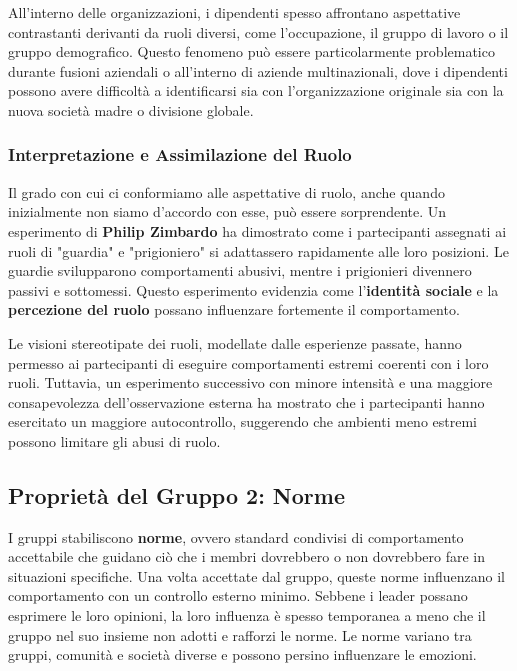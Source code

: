 \documentclass{article}
\begin{document}
All'interno delle organizzazioni, i dipendenti spesso affrontano aspettative contrastanti derivanti da ruoli diversi, come l'occupazione, il gruppo di lavoro o il gruppo demografico. Questo fenomeno può essere particolarmente problematico durante fusioni aziendali o all'interno di aziende multinazionali, dove i dipendenti possono avere difficoltà a identificarsi sia con l'organizzazione originale sia con la nuova società madre o divisione globale.

\subsubsection{Interpretazione e Assimilazione del Ruolo}

Il grado con cui ci conformiamo alle aspettative di ruolo, anche quando inizialmente non siamo d'accordo con esse, può essere sorprendente. Un esperimento di \textbf{Philip Zimbardo} ha dimostrato come i partecipanti assegnati ai ruoli di "guardia" e "prigioniero" si adattassero rapidamente alle loro posizioni. Le guardie svilupparono comportamenti abusivi, mentre i prigionieri divennero passivi e sottomessi. Questo esperimento evidenzia come l'\textbf{identità sociale} e la \textbf{percezione del ruolo} possano influenzare fortemente il comportamento.

Le visioni stereotipate dei ruoli, modellate dalle esperienze passate, hanno permesso ai partecipanti di eseguire comportamenti estremi coerenti con i loro ruoli. Tuttavia, un esperimento successivo con minore intensità e una maggiore consapevolezza dell'osservazione esterna ha mostrato che i partecipanti hanno esercitato un maggiore autocontrollo, suggerendo che ambienti meno estremi possono limitare gli abusi di ruolo.

\subsection{Proprietà del Gruppo 2: Norme}

I gruppi stabiliscono \textbf{norme}, ovvero standard condivisi di comportamento accettabile che guidano ciò che i membri dovrebbero o non dovrebbero fare in situazioni specifiche. Una volta accettate dal gruppo, queste norme influenzano il comportamento con un controllo esterno minimo. Sebbene i leader possano esprimere le loro opinioni, la loro influenza è spesso temporanea a meno che il gruppo nel suo insieme non adotti e rafforzi le norme. Le norme variano tra gruppi, comunità e società diverse e possono persino influenzare le emozioni.
\end{document}
